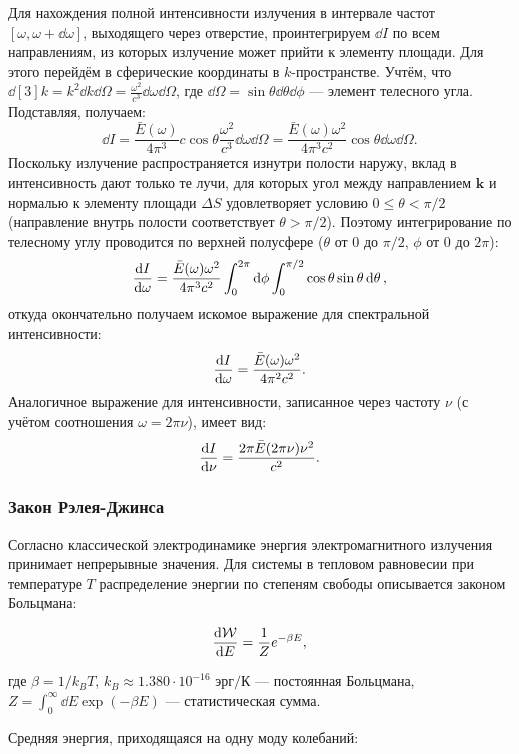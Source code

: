 \documentclass[a4paper, 12pt]{article}
\begin{document}
Для нахождения полной интенсивности излучения в интервале частот
$[\omega, \omega + \dd{\omega}]$, выходящего через отверстие, проинтегрируем $\dd{I}$ по всем
направлениям, из которых излучение может прийти к элементу площади. Для этого
перейдём в сферические координаты в $k$-пространстве. Учтём, что
$\dd[3]{k} = k^2 \dd{k} \dd{\Omega} = \frac{\omega^2}{c^3} \dd{\omega} \dd{\Omega}$, где
$\dd{\Omega} = \sin\theta \dd{\theta} \dd{\phi}$ — элемент телесного угла. Подставляя, получаем:
\[
\dd{I} = \frac{\bar{E}(\omega)}{4\pi^3} c \cos\theta \frac{\omega^2}{c^3} \dd{\omega} \dd{\Omega} = \frac{\bar{E}(\omega) \omega^2}{4\pi^3 c^2} \cos\theta \dd{\omega} \dd{\Omega}.
\]
Поскольку излучение распространяется изнутри полости наружу, вклад в
интенсивность дают только те лучи, для которых угол между направлением $\bm{k}$ и
нормалью к элементу площади $\Delta S$ удовлетворяет условию $0 \leqslant \theta < \pi/2$ (направление внутрь
полости соответствует $\theta > \pi/2$). Поэтому интегрирование по телесному углу
проводится по верхней полусфере ($\theta$ от $0$ до $\pi/2$, $\phi$ от $0$ до $2\pi$):
\[
\dv{I}{\omega} = \frac{\bar{E}(\omega) \omega^2}{4\pi^3 c^2} \int_0^{2\pi} \dd{\phi} \int_0^{\pi/2} \cos\theta \sin\theta \dd{\theta},
\]
откуда окончательно получаем искомое выражение для спектральной интенсивности:
\[
\dv{I}{\omega} = \frac{\bar{E}(\omega) \omega^2}{4\pi^2 c^2}.
\]
Аналогичное выражение для интенсивности, записанное через частоту $\nu$ (с учётом
соотношения $\omega = 2\pi\nu$), имеет вид:
\begin{equation}
  \label{eq:black-body-intensity}
  \dv{I}{\nu} = \frac{2\pi \bar{E}(2\pi\nu) \nu^2}{c^2}.
\end{equation}

\subsubsection*{Закон Рэлея-Джинса}

Согласно классической электродинамике энергия электромагнитного излучения принимает непрерывные значения. Для системы в тепловом равновесии при температуре $T$ распределение энергии по степеням свободы описывается законом Больцмана:

\[
\dv{\mathcal{W}}{E} = \frac{1}{Z} e^{-\beta E},
\]

где $\beta = 1/k_B T$, $k_B\approx 1.380 \cdot 10^{-16}\text{ эрг/К}$ — постоянная Больцмана, $Z = \int_0^\infty \dd{E} \exp(-\beta E)$ — статистическая сумма.

Средняя энергия, приходящаяся на одну моду колебаний:
\end{document}
